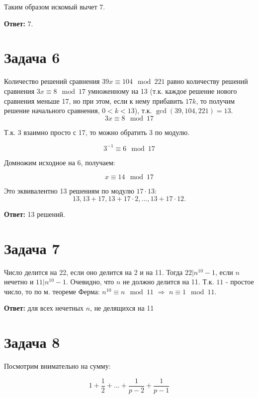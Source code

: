 \documentclass{article}
\begin{document}
	Таким образом искомый вычет $7$.
	
	\textbf{Ответ:} 7.
	
	\section{Задача 6}
	
	Количество решений сравнения $39x \equiv 104 \mod 221$ равно количеству решений сравнения $3x \equiv 8 \mod 17$ умноженному на 13 (т.к. каждое решение нового сравнения меньше 17, но при этом, если к нему прибавить $17k$, то получим решение начального сравнения, $0< k <13$), т.к. $\gcd(39, 104, 221) = 13$.
	\\
	$$3x \equiv 8 \mod 17$$
	
	Т.к. 3 взаимно просто с 17, то можно обратить 3 по модулю.
	
	$$3^{-1} \equiv 6 \mod 17$$
	
	Домножим исходное на 6, получаем:
	
	$$ x \equiv 14 \mod 17$$
	
	Это эквивалентно 13 решениям по модулю $17 \cdot 13$: $$13, 13 + 17, 13 + 17\cdot 2, ..., 13 + 17\cdot 12.$$
	
	\textbf{Ответ:} 13 решений. 
                             
	\section{Задача 7}                                                                                                                                                   
	
	Число делится на 22, если оно делится на 2 и на 11. Тогда $22 | n^{10} - 1$, если $n$ нечетно и $11|n^{10} - 1$. Очевидно, что $n$ не должно делится на 11. Т.к. $11$ - простое число, то по м. теореме Ферма: $n^{10} \equiv n \mod 11$ $\Rightarrow$ $n \equiv 1 \mod 11$.

	
	\textbf{Ответ:} для всех нечетных $n$, не делящихся на 11
	
	\section{Задача 8}
	
	Посмотрим внимательно на сумму:
	
	$$ 1 + \frac{1}{2} + ... + \frac{1}{p - 2} + \frac{1}{p - 1} $$
	
\end{document}
